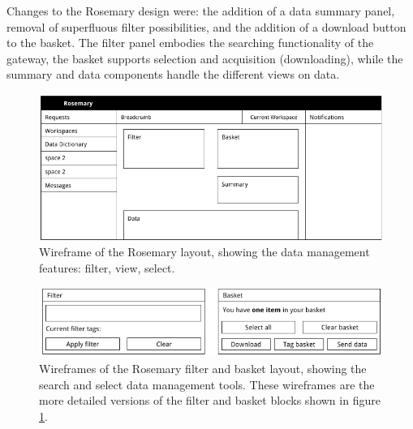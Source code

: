 Changes to the Rosemary design were: the addition of a data summary panel, removal of superfluous filter possibilities, and the addition of a download button to the basket.
The filter panel embodies the searching functionality of the gateway, the basket supports selection and acquisition (downloading), while the summary and data components handle the different views on data.

\begin{figure}[hb]
	\centering
	\includegraphics[width=1.0\linewidth]{images/evaluation-layout}
	\caption{
		Wireframe of the Rosemary layout, showing the data management features: filter, view, select.
	}
	\label{fig:wireframe-layout}
\end{figure}

\begin{figure}[hb]
	\centering
	\includegraphics[width=1.0\linewidth]{images/evaluation-basket-layout}
	\caption{
		Wireframes of the Rosemary filter and basket layout, showing the search and select data management tools.
		These wireframes are the more detailed versions of the filter and basket blocks shown in figure \ref{fig:wireframe-layout}.
	}
	\label{fig:wireframe-basket-layout}
\end{figure}